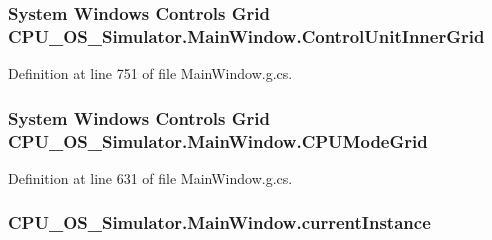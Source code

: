 \subsubsection[{Control\+Unit\+Inner\+Grid}]{\setlength{\rightskip}{0pt plus 5cm}System Windows Controls Grid C\+P\+U\+\_\+\+O\+S\+\_\+\+Simulator.\+Main\+Window.\+Control\+Unit\+Inner\+Grid\hspace{0.3cm}{\ttfamily [package]}}\label{class_c_p_u___o_s___simulator_1_1_main_window_a0bb4b4233380c349ee3bef69813a684b}


Definition at line 751 of file Main\+Window.\+g.\+cs.

\hypertarget{class_c_p_u___o_s___simulator_1_1_main_window_ab6afb45d3f05517e9df6af167752be77}{}
\subsubsection[{C\+P\+U\+Mode\+Grid}]{\setlength{\rightskip}{0pt plus 5cm}System Windows Controls Grid C\+P\+U\+\_\+\+O\+S\+\_\+\+Simulator.\+Main\+Window.\+C\+P\+U\+Mode\+Grid\hspace{0.3cm}{\ttfamily [package]}}\label{class_c_p_u___o_s___simulator_1_1_main_window_ab6afb45d3f05517e9df6af167752be77}


Definition at line 631 of file Main\+Window.\+g.\+cs.

\hypertarget{class_c_p_u___o_s___simulator_1_1_main_window_a1280266cc57403a91f08a8350dee05cc}{}
\subsubsection[{current\+Instance}]{ C\+P\+U\+\_\+\+O\+S\+\_\+\+Simulator.\+Main\+Window.\+current\+Instance\hspace{0.3cm}{\ttfamily [static]}}\label{class_c_p_u___o_s___simulator_1_1_main_window_a1280266cc57403a91f08a8350dee05cc}


